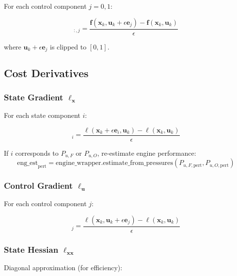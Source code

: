 \documentclass[11pt,a4paper]{article}
\begin{document}
For each control component $j = 0, 1$:

\begin{equation}
[\mathbf{B}_k]_{:,j} = \frac{\mathbf{f}(\mathbf{x}_k, \mathbf{u}_k + \epsilon \mathbf{e}_j) - \mathbf{f}(\mathbf{x}_k, \mathbf{u}_k)}{\epsilon}
\end{equation}

where $\mathbf{u}_k + \epsilon \mathbf{e}_j$ is clipped to $[0, 1]$.

\subsection{Cost Derivatives}

\subsubsection{State Gradient $\ell_{\mathbf{x}}$}

For each state component $i$:

\begin{equation}
[\ell_{\mathbf{x}}]_i = \frac{\ell(\mathbf{x}_k + \epsilon \mathbf{e}_i, \mathbf{u}_k) - \ell(\mathbf{x}_k, \mathbf{u}_k)}{\epsilon}
\end{equation}

If $i$ corresponds to $P_{u,F}$ or $P_{u,O}$, re-estimate engine performance:
\begin{equation}
\text{eng\_est}_{\text{pert}} = \text{engine\_wrapper.estimate\_from\_pressures}(P_{u,F,\text{pert}}, P_{u,O,\text{pert}})
\end{equation}

\subsubsection{Control Gradient $\ell_{\mathbf{u}}$}

For each control component $j$:

\begin{equation}
[\ell_{\mathbf{u}}]_j = \frac{\ell(\mathbf{x}_k, \mathbf{u}_k + \epsilon \mathbf{e}_j) - \ell(\mathbf{x}_k, \mathbf{u}_k)}{\epsilon}
\end{equation}

\subsubsection{State Hessian $\ell_{\mathbf{xx}}$}

Diagonal approximation (for efficiency):
\end{document}
